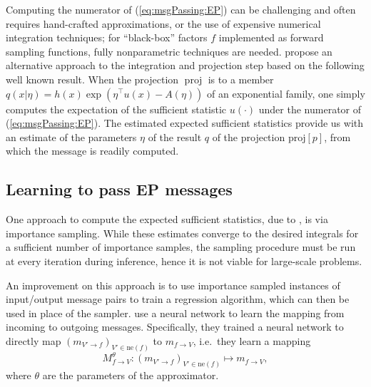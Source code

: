 \documentclass[english]{article}
\theoremstyle{plain}
\theoremstyle{plain}
\newcommand{\factor}{f}				%
\newcommand{\outV}{V}                         %
\newcommand{\fis}[1]{\mathrm{ne}(#1)}   	%
\newcommand{\msg}[2]{m_{#1 \rightarrow #2}}			%
\newcommand{\approxMsg}[3]{M_{#1 \rightarrow #2}^{#3}}			%
\newcommand{\projP}[1]{\mathrm{proj} \left [ #1 \right]}
\DeclareMathOperator*{\proj}{\text{proj}} %
\newcommand{\dsnote}[1]{}%
\begin{document}
Computing the numerator of (\ref{eq:msgPassing:EP}) can be challenging and
often requires hand-crafted approximations, or
the use of expensive numerical integration techniques; for ``black-box''
factors $\factor$ implemented as forward sampling functions, fully
nonparametric techniques are needed. 
\citet{Barthelme2011,Heess2013,Eslami2014} propose an alternative
approach to the integration and projection step based on the following well known result.  
When the projection $\proj$
is to a member $q(x|\eta)=h(x)\exp\left(\eta^{\top}u(x)-A(\eta)\right)$ of an
exponential family, one simply computes the expectation of the sufficient
statistic $u(\cdot)$ under the numerator of (\ref{eq:msgPassing:EP}).
The estimated expected sufficient statistics provide us with an estimate
of the parameters $\eta$ of the result $q$ of the projection $\projP{p}$, from
which the message is readily computed.\dsnote{isn't $\eta$ the actual message?}



\subsection{Learning to pass EP messages}
\label{sec:EP:JIT}

One approach to compute the expected sufficient statistics, due to \citet{Barthelme2011}, is 
via importance sampling.  While these estimates converge to the desired
integrals for a sufficient number of importance samples, the sampling procedure
must be run at every iteration during inference, hence  it is not viable for
large-scale problems.

An improvement on this approach is to use importance sampled instances of input/output
message pairs to train a regression algorithm, which can then be used in place of the sampler.
\citet{Heess2013} use a neural network to learn the mapping from incoming
to outgoing messages. Specifically, they trained 
a neural network to directly map $(\msg{\outV'}{\factor} )_{\outV'
    \in \fis{\factor}}$ to 
    $\msg{\factor}{\outV}$, i.e.\ they learn a mapping
\begin{equation}
\approxMsg{\factor}{\outV}{\theta}: (\msg{\outV'}{\factor} )_{\outV' \in \fis{\factor}} \mapsto \msg{\factor}{\outV},
\end{equation}
where $\theta$ are the parameters of the approximator.
\end{document}
